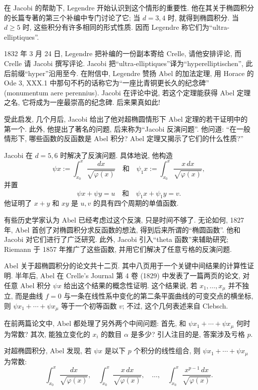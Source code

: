 在 Jacobi 的帮助下, Legendre 开始认识到这个情形的重要性. 他在其关于椭圆积分的长篇专著的第三个补编中专门讨论了它; 当 $d=3,4$ 时, 就得到椭圆积分. 当 $d\geq5$ 时, 这些积分有许多相同的形式性质. 因而 Legendre 称它们为“ultra-elliptiques”.

1832 年 3 月 24 日, Legendre 把补编的一份副本寄给 Crelle, 请他安排评论, 而 Crelle 请 Jacobi 撰写评论. Jacobi 把“ultra-elliptiques”译为“hyperelliptischen”, 此后前缀“hyper”沿用至今. 在附信中, Legendre 赞扬 Abel 的加法定理, 用 Horace 的 Ode 3, XXX.1 中那句不朽的话称它为“一座比青铜更长久的纪念碑” (monumentum aere perennius). Jacobi 在评论中说, 若这个定理能获得 Abel 定理之名, 它将成为一座最崇高的纪念碑. 后来果真如此!

受此启发, 几个月后, Jacobi 给出了他对超椭圆情形下 Abel 定理的若干证明中的第一个. 此外, 他提出了著名的问题, 后来称为“Jacobi 反演问题”. 他问道: “在一般情形下, 哪些函数的反函数是 Abel 积分? Abel 定理又揭示了它们的什么性质?”

Jacobi 在 $d=5,6$ 时解决了反演问题. 具体地说, 他构造
\[
\psi x:=\int_{x_0}^x\frac{dx}{\sqrt{\varphi(x)}}\quad\text{和}\quad
\psi_1x:=\int_{x_0}^x\frac{x\,dx}{\sqrt{\varphi(x)}},
\]
并置
\[
\psi x+\psi y=u\quad\text{和}\quad\psi_1x+\psi_1y=v.
\]
他证明了 $x+y$ 和 $xy$ 是 $u,v$ 的具有四个周期的单值函数.

有些历史学家认为 Abel 已经考虑过这个反演, 只是时间不够了. 无论如何, 1827 年, Abel 首创了对椭圆积分求反函数的想法, 得到后来所谓的“椭圆函数”. 他和 Jacobi 对它们进行了广泛研究. 此外, Jacobi 引入“theta 函数”来辅助研究; Riemann 于 1857 年推广了这些函数, 并用它们解决了任意亏格的反演问题.

Abel 关于超椭圆积分的论文共十二页. 其中八页用于一个关键中间结果的计算性证明. 半年后, Abel 在 Crelle's Journal 第 4 卷 (1829) 中发表了一篇两页的论文, 对任意 Abel 积分 $\psi x$ 给出这个结果的概念性证明. 这个结果说, 若 $x_1,\ldots,x_\mu$ 并不独立, 而是曲线 $f=0$ 与一条在线性系中变化的第二条平面曲线的可变交点的横坐标, 则 $\psi x_1+\cdots+\psi x_\mu$ 等于一个初等函数 $v$; 不过, 这个几何表述来自 Clebsch.

在前两篇论文中, Abel 都处理了另外两个中间问题: 首先, 和 $\psi x_1+\cdots+\psi x_\mu$ 何时为常数? 其次, 能独立变化的 $x_i$ 的数目 $\alpha$ 是多少? 引人注目的是, 答案涉及亏格 $p$.

对超椭圆积分, Abel 发现, 若 $\psi x$ 是以下 $p$ 个积分的线性组合, 则 $\psi x_1+\cdots+\psi x_\mu$ 为常数:
\[
\int_{x_0}^x\frac{dx}{\sqrt{\varphi(x)}},\quad
\int_{x_0}^x\frac{x\,dx}{\sqrt{\varphi(x)}},\quad\ldots,\quad
\int_{x_0}^x\frac{x^{p-1}\,dx}{\sqrt{\varphi(x)}}.
\]

